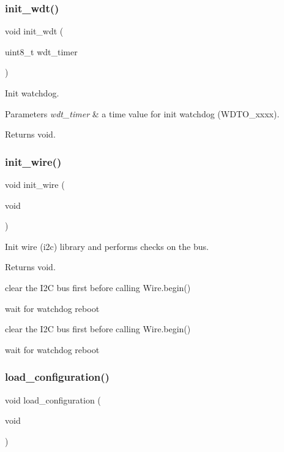 \subsubsection{\texorpdfstring{init\+\_\+wdt()}{init\_wdt()}}
{\footnotesize\ttfamily void init\+\_\+wdt (\begin{DoxyParamCaption}\item[{uint8\+\_\+t}]{wdt\+\_\+timer }\end{DoxyParamCaption})}



Init watchdog. 


\begin{DoxyParams}{Parameters}
{\em wdt\+\_\+timer} & a time value for init watchdog (W\+D\+T\+O\+\_\+xxxx). \\
\hline
\end{DoxyParams}
\begin{DoxyReturn}{Returns}
void. 
\end{DoxyReturn}
\mbox{\label{rmap_8ino_a2441543100bf8421f56edd622a2c1d9a}} 
\subsubsection{\texorpdfstring{init\+\_\+wire()}{init\_wire()}}
{\footnotesize\ttfamily void init\+\_\+wire (\begin{DoxyParamCaption}\item[{void}]{ }\end{DoxyParamCaption})}



Init wire (i2c) library and performs checks on the bus. 

\begin{DoxyReturn}{Returns}
void. 
\end{DoxyReturn}
clear the I2C bus first before calling Wire.\+begin()

wait for watchdog reboot

clear the I2C bus first before calling Wire.\+begin()

wait for watchdog reboot \mbox{\label{rmap_8ino_a32a64a2800c724fb28e10636f2ec20b9}} 
\subsubsection{\texorpdfstring{load\+\_\+configuration()}{load\_configuration()}}
{\footnotesize\ttfamily void load\+\_\+configuration (\begin{DoxyParamCaption}\item[{void}]{ }\end{DoxyParamCaption})}



